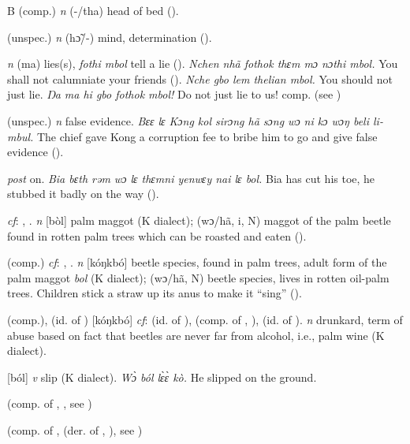 \begin{letter}{B}
 (comp.) \textit{n} (-/tha) head of bed (\citealt{Pichl1967}). 

 (unspec.) \textit{n} (hɔ̃/-) mind, determination (\citealt{Pichl1967}). 

 \textit{n} (ma) lies(s), \textit{fothi mbol} tell a lie (\citealt{Pichl1967}). \textit{Nchen nhã fothok thɛm mɔ nɔthi mbol.} You shall not calumniate your friends (\citealt{Pichl1967}). \textit{Nche gbo lem thelian mbol.} You should not just lie. \textit{Ŋa ma hi gbo fothok mbol!} Do not just lie to us! comp.  (see ) 

 (unspec.) \textit{n} false evidence. \textit{Bɛɛ lɛ Kɔng kol sirɔng hã sɔng wɔ ni kɔ wɔŋ beli li-mbul.} The chief gave Kong a corruption fee to bribe him to go and give false evidence (\citealt{Pichl1967}). 

 \textit{post} on. \textit{Bia bɛth rəm wɔ lɛ thɛmni yenwɛy nai lɛ bol.} Bia has cut his toe, he stubbed it badly on the way (\citealt{Pichl1967}). 

 \textit{cf}: , . \textit{n} [bòl] palm maggot (K dialect); (wɔ/hã, i, N) maggot of the palm beetle found in rotten palm trees which can be roasted and eaten (\citealt{Pichl1967}). 

 (comp.) \textit{cf}: , . \textit{n} [kóŋkbó] beetle species, found in palm trees, adult form of the palm maggot \textit{bol} (K dialect); (wɔ/hã, N) beetle species, lives in rotten oil-palm trees. Children stick a straw up its anus to make it “sing” (\citealt{Pichl1967}).

 (comp.), (id. of ) [kóŋkbó] \textit{cf}:  (id. of ),  (comp. of , ),  (id. of ). \textit{n} drunkard, term of abuse based on fact that beetles are never far from alcohol, i.e., palm wine (K dialect). 

 [ból] \textit{v} slip (K dialect). \textit{Wɔ̀ ból lɛ̀ɛ̀ kò.} He slipped on the ground. 

 (comp. of , , see ) 

 (comp. of ,  (der. of , ), see ) 


\end{letter}
